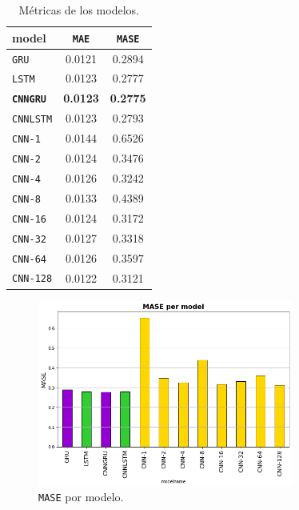 \documentclass[a4paper,12pt]{article}
\begin{document}
\begin{table}[H]
\centering
\begin{tabular}{lcc}
\hline
\multicolumn{1}{l}{model} & \texttt{MAE} & \texttt{MASE} \\ \hline
\texttt{GRU}                                    & 0.0121    & 0.2894        \\
\texttt{LSTM}                                   & 0.0123    & 0.2777        \\
\textbf{\texttt{CNNGRU}}                                 & \textbf{0.0123}    & \textbf{0.2775}        \\
\texttt{CNNLSTM}                                & 0.0123    & 0.2793        \\
\texttt{CNN-1}                                  & 0.0144    & 0.6526        \\
\texttt{CNN-2}                                  & 0.0124    & 0.3476        \\
\texttt{CNN-4}                                  & 0.0126    & 0.3242        \\
\texttt{CNN-8}                                  & 0.0133    & 0.4389        \\
\texttt{CNN-16}                                 & 0.0124    & 0.3172        \\
\texttt{CNN-32}                                 & 0.0127    & 0.3318        \\
\texttt{CNN-64}                                 & 0.0126    & 0.3597        \\
\texttt{CNN-128}                                & 0.0122    & 0.3121        \\ \hline
\end{tabular}
\caption{Métricas de los modelos.}
\label{tab:metrics-models}
\end{table}

\begin{figure}[H]
	\begin{center}
	\includegraphics[width=0.75\textwidth]{mase_per_model.png}
  	\caption{\texttt{MASE} por modelo.}
  	\label{fig:mase_per_model}
  	\end{center}
\end{figure}
\end{document}
